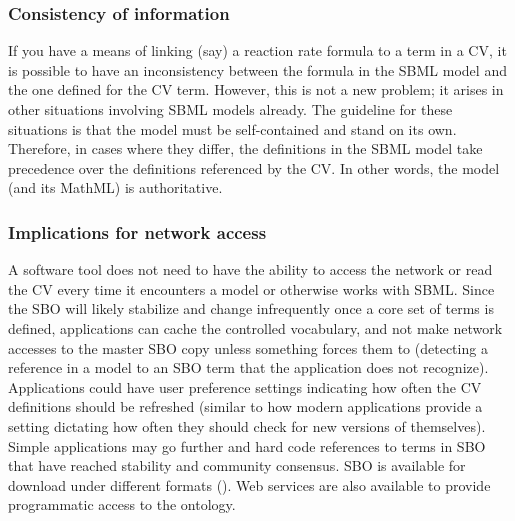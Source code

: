 \subsubsection{Consistency of information}

If you have a means of linking (say) a reaction rate formula to a
term in a CV, it is possible to have an inconsistency between the
formula in the SBML model and the one defined for the CV term.
However, this is not a new problem; it arises in other situations
involving SBML models already.  The guideline for these situations
is that the model must be self-contained and stand on its own.
Therefore, in cases where they differ, the definitions in the SBML
model take precedence over the definitions referenced by the CV.
In other words, the model (and its MathML) is authoritative.


\subsubsection{Implications for network access}
\label{sec:sbo-implications-for-network-access}

A software tool does not need to have the ability to access the
network or read the CV every time it encounters a model or
otherwise works with SBML.  Since the SBO will likely stabilize
and change infrequently once a core set of terms is defined,
applications can cache the controlled vocabulary, and not make
network accesses to the master SBO copy unless something forces
them to (\eg detecting a reference in a model to an SBO term that
the application does not recognize).  Applications could have user
preference settings indicating how often the CV definitions should
be refreshed (similar to how modern applications provide a setting
dictating how often they should check for new versions of
themselves).  Simple applications may go further and hard code
references to terms in SBO that have reached stability and
community consensus. SBO is available for download under different
formats (\sboref).  Web services are also available to provide
programmatic access to the ontology.
